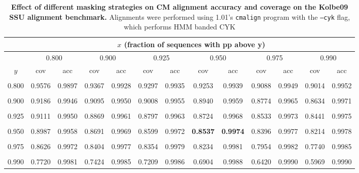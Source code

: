 \begin{table}
\begin{center}
\begin{tabular}{|c||cc|cc|cc|cc|cc|cc|}
\multicolumn{1}{c}{} & \multicolumn{12}{c}{$x$ (fraction of sequences with pp above y)} \\ \hline
      & \multicolumn{2}{c|}{0.800} & \multicolumn{2}{c|}{0.900} & \multicolumn{2}{c|}{0.925} & \multicolumn{2}{c|}{0.950} & \multicolumn{2}{c|}{0.975} & \multicolumn{2}{c|}{0.990} \\ \cline{2-13}
 $y$  &     cov  & acc    &  cov    & acc     &  cov    & acc    &  cov    & acc    &     cov & acc    &      cov & acc    \\ \hline
& & & & & & & & & & & & \\
0.800 &   0.9576 & 0.9897 &  0.9367 & 0.9928  &  0.9297 & 0.9935 &  0.9253 & 0.9939 &  0.9088 & 0.9949 &   0.9014 & 0.9952 \\
& & & & & & & & & & & & \\
0.900 &   0.9186 & 0.9946 &  0.9095 & 0.9950  &  0.9008 & 0.9955 &  0.8940 & 0.9959 &  0.8774 & 0.9965 &   0.8634 & 0.9971 \\
& & & & & & & & & & & & \\
0.925 &   0.9111 & 0.9950 &  0.8869 & 0.9961  &  0.8797 & 0.9963 &  0.8724 & 0.9968 &  0.8533 & 0.9973 &   0.8441 & 0.9975 \\
& & & & & & & & & & & & \\
0.950 &   0.8987 & 0.9958 &  0.8691 & 0.9969  &  0.8599 & 0.9972 &  {\bf 0.8537} & {\bf 0.9974} &  0.8396 & 0.9977 &   0.8214 & 0.9978 \\
& & & & & & & & & & & & \\
0.975 &   0.8626 & 0.9972 &  0.8404 & 0.9977  &  0.8354 & 0.9979 &  0.8234 & 0.9981 &  0.7954 & 0.9982 &   0.7740 & 0.9985 \\
& & & & & & & & & & & & \\
0.990 &   0.7720 & 0.9981 &  0.7424 & 0.9985  &  0.7209 & 0.9986 &  0.6904 & 0.9988 &  0.6420 & 0.9990 &   0.5969 & 0.9990 \\ \hline
\end{tabular}
\end{center}
\caption[Effect of different masking strategies on CM alignment
  accuracy and coverage on the Kolbe09 SSU alignment benchmark]{
  \textbf{Effect of different masking strategies on CM alignment
  accuracy and coverage on the Kolbe09 SSU alignment benchmark.}
  Alignments were performed using  1.01's {\tt cmalign}
  program with the {\tt --cyk} flag, which performs HMM banded CYK
}
\end{table}
